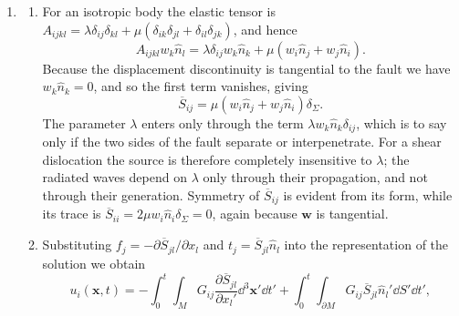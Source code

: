 \documentclass[a4paper,10pt]{paper}
\begin{document}
\begin{enumerate}
If the initial stress does not vanish, the elastic tensor takes the form
\begin{equation*}
    A_{ijkl}=4\frac{\partial^{2}U}{\partial C_{ij}\partial C_{kl}}+\delta_{ik}\sigma_{lj},
\end{equation*}
where $\sigma_{ij}=2\frac{\partial U}{\partial C_{ij}}$ is the (symmetric) equilibrium stress. Here the first term on the right has the full elastic symmetries, but the term depending on the equilibrium stress only obeys the hyperelastic symmetry. Thus, in a pre-stressed medium the elastic tensor loses some of its symmetries. Moreover, it can be shown that for a non-hydrostatic equilibrium stress, the second term is associated with anisotropy.

\item
\begin{enumerate}
    \item For an isotropic body the elastic tensor is $A_{ijkl}=\lambda\delta_{ij}\delta_{kl}+\mu(\delta_{ik}\delta_{jl}+\delta_{il}\delta_{jk})$, and hence
    \begin{equation*}
        A_{ijkl}w_{k}\hat{n}_{l}=\lambda\delta_{ij}w_{k}\hat{n}_{k}+\mu(w_{i}\hat{n}_{j}+w_{j}\hat{n}_{i}).
    \end{equation*}
    Because the displacement discontinuity is tangential to the fault we have $w_{k}\hat{n}_{k}=0$, and so the first term vanishes, giving
    \begin{equation*}
        \overline{S}_{ij}=\mu(w_{i}\hat{n}_{j}+w_{j}\hat{n}_{i})\delta_{\Sigma}.
    \end{equation*}
    The parameter $\lambda$ enters only through the term $\lambda w_{k}\hat{n}_{k}\delta_{ij}$, which is to say only if the two sides of the fault separate or interpenetrate. For a shear dislocation the source is therefore completely insensitive to $\lambda$; the radiated waves depend on $\lambda$ only through their propagation, and not through their generation. Symmetry of $\overline{S}_{ij}$ is evident from its form, while its trace is $\overline{S}_{ii}=2\mu w_{i}\hat{n}_{i}\delta_{\Sigma}=0$, again because $\mathbf{w}$ is tangential.
    \item Substituting $f_{j}=-\partial\overline{S}_{jl}/\partial x_{l}$ and $t_{j}=\overline{S}_{jl}\hat{n}_{l}$ into the representation of the solution we obtain
    \begin{equation*}
        u_{i}(\mathbf{x},t)=-\int_{0}^{t}\int_{M}G_{ij}\frac{\partial\overline{S}_{jl}}{\partial x_{l}'}\dd^{3}\mathbf{x}'\dd t'+\int_{0}^{t}\int_{\partial M}G_{ij}\overline{S}_{jl}\hat{n}_{l}'\dd S'\dd t',

\end{equation*}
\end{enumerate}
\end{enumerate}
\end{document}
